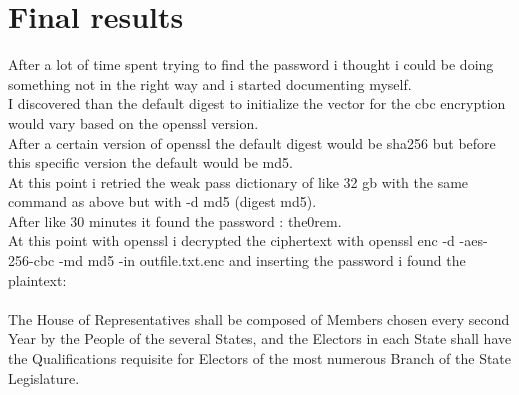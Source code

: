 \documentclass{article}
\begin{document}
\section{Final results}
After a lot of time spent trying to find the password i thought i could be doing something not in the right way and i started documenting myself.\\
I discovered than the default digest to initialize the vector for the cbc encryption would vary based on the openssl version.\\
After a certain version of openssl the default digest would be sha256 but before this specific version the default would be md5.\\
At this point i retried the weak pass dictionary of like 32 gb with the same command as above but with -d md5 (digest md5).\\
After like 30 minutes it found the password : the0rem.\\
At this point with openssl i decrypted the ciphertext with openssl enc -d -aes-256-cbc -md md5 -in outfile.txt.enc and inserting the password i found the plaintext:\\\\
The House of Representatives shall be composed of Members chosen every second Year by the People of the several States, and the Electors in each State shall have the Qualifications requisite for Electors of the most numerous Branch of the State Legislature.
\end{document}
